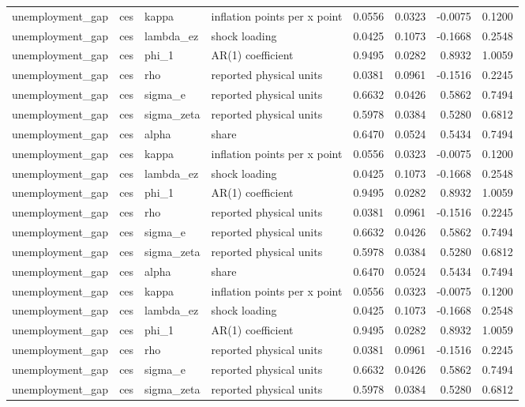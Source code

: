 \begin{tabular}{llllrrrr}
unemployment\_gap & ces & kappa & inflation points per x point & 0.0556 & 0.0323 & -0.0075 & 0.1200 \\
unemployment\_gap & ces & lambda\_ez & shock loading & 0.0425 & 0.1073 & -0.1668 & 0.2548 \\
unemployment\_gap & ces & phi\_1 & AR(1) coefficient & 0.9495 & 0.0282 & 0.8932 & 1.0059 \\
unemployment\_gap & ces & rho & reported physical units & 0.0381 & 0.0961 & -0.1516 & 0.2245 \\
unemployment\_gap & ces & sigma\_e & reported physical units & 0.6632 & 0.0426 & 0.5862 & 0.7494 \\
unemployment\_gap & ces & sigma\_zeta & reported physical units & 0.5978 & 0.0384 & 0.5280 & 0.6812 \\
unemployment\_gap & ces & alpha & share & 0.6470 & 0.0524 & 0.5434 & 0.7494 \\
unemployment\_gap & ces & kappa & inflation points per x point & 0.0556 & 0.0323 & -0.0075 & 0.1200 \\
unemployment\_gap & ces & lambda\_ez & shock loading & 0.0425 & 0.1073 & -0.1668 & 0.2548 \\
unemployment\_gap & ces & phi\_1 & AR(1) coefficient & 0.9495 & 0.0282 & 0.8932 & 1.0059 \\
unemployment\_gap & ces & rho & reported physical units & 0.0381 & 0.0961 & -0.1516 & 0.2245 \\
unemployment\_gap & ces & sigma\_e & reported physical units & 0.6632 & 0.0426 & 0.5862 & 0.7494 \\
unemployment\_gap & ces & sigma\_zeta & reported physical units & 0.5978 & 0.0384 & 0.5280 & 0.6812 \\
unemployment\_gap & ces & alpha & share & 0.6470 & 0.0524 & 0.5434 & 0.7494 \\
unemployment\_gap & ces & kappa & inflation points per x point & 0.0556 & 0.0323 & -0.0075 & 0.1200 \\
unemployment\_gap & ces & lambda\_ez & shock loading & 0.0425 & 0.1073 & -0.1668 & 0.2548 \\
unemployment\_gap & ces & phi\_1 & AR(1) coefficient & 0.9495 & 0.0282 & 0.8932 & 1.0059 \\
unemployment\_gap & ces & rho & reported physical units & 0.0381 & 0.0961 & -0.1516 & 0.2245 \\
unemployment\_gap & ces & sigma\_e & reported physical units & 0.6632 & 0.0426 & 0.5862 & 0.7494 \\
unemployment\_gap & ces & sigma\_zeta & reported physical units & 0.5978 & 0.0384 & 0.5280 & 0.6812 \\

\end{tabular}
